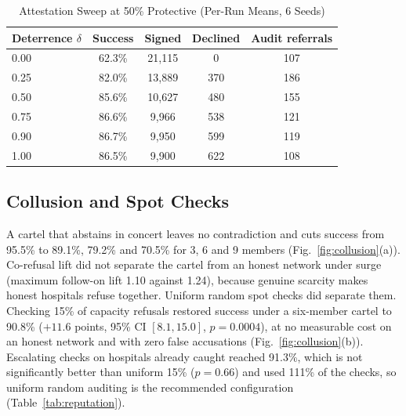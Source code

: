 \begin{table}[!t]
\centering
\caption{Attestation Sweep at 50\% Protective (Per-Run Means, 6 Seeds)}
\label{tab:attest}
\scriptsize
\setlength{\tabcolsep}{3.5pt}
\begin{tabular}{@{}lcccc@{}}
\toprule
Deterrence $\delta$ & Success & Signed & Declined & Audit referrals \\
\midrule
0.00 & 62.3\% & 21,115 & 0   & 107 \\
0.25 & 82.0\% & 13,889 & 370 & 186 \\
0.50 & 85.6\% & 10,627 & 480 & 155 \\
0.75 & 86.6\% & 9,966  & 538 & 121 \\
0.90 & 86.7\% & 9,950  & 599 & 119 \\
1.00 & 86.5\% & 9,900  & 622 & 108 \\
\bottomrule
\end{tabular}
\end{table}

\subsection{Collusion and Spot Checks}
\label{sec:res-collusion}
A cartel that abstains in concert leaves no contradiction and cuts success from 95.5\% to 89.1\%, 79.2\% and 70.5\% for 3, 6 and 9 members (Fig.~\ref{fig:collusion}(a)). Co-refusal lift did not separate the cartel from an honest network under surge (maximum follow-on lift 1.10 against 1.24), because genuine scarcity makes honest hospitals refuse together. Uniform random spot checks did separate them. Checking 15\% of capacity refusals restored success under a six-member cartel to 90.8\% ($+11.6$ points, 95\% CI $[8.1,15.0]$, $p=0.0004$), at no measurable cost on an honest network and with zero false accusations (Fig.~\ref{fig:collusion}(b)). Escalating checks on hospitals already caught reached 91.3\%, which is not significantly better than uniform 15\% ($p=0.66$) and used 111\% of the checks, so uniform random auditing is the recommended configuration (Table~\ref{tab:reputation}).

